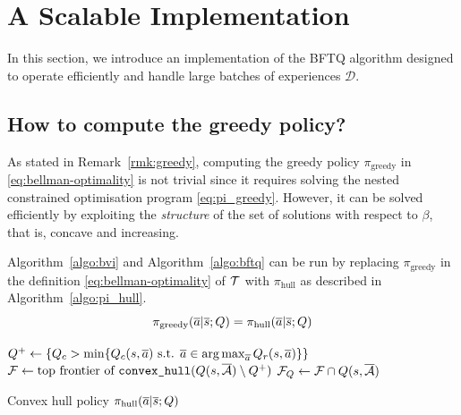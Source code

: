 \documentclass{article}
\begin{document}
\section{A Scalable Implementation}

\label{sec:scalable-bftq}
In this section, we introduce an implementation of the BFTQ algorithm designed to operate efficiently and handle large batches of experiences $\mathcal{D}$.

\subsection{How to compute the greedy policy?}

As stated in Remark~\ref{rmk:greedy}, computing the greedy policy $\pi_\text{greedy}$ in \eqref{eq:bellman-optimality} is not trivial since it requires solving the nested constrained optimisation program \eqref{eq:pi_greedy}.
However, it can be solved efficiently by exploiting the \emph{structure} of the set of solutions with respect to $\beta$, that is, concave and increasing. 

\begin{proposition}
\label{prop:bftq_pi_hull}
Algorithm~\ref{algo:bvi} and Algorithm~\ref{algo:bftq} can be run by replacing $\pi_\text{greedy}$ in the definition \eqref{eq:bellman-optimality} of $\mathcal{T}$ with $\pi_\text{hull}$ as described in Algorithm~\ref{algo:pi_hull}.
\begin{equation*}
    \pi_\text{greedy}(\overline{a}|\overline{s}; Q) = \pi_\text{hull}(\overline{a}|\overline{s}; Q)
\end{equation*}
\end{proposition}

\begin{algorithm}
\DontPrintSemicolon
{}
$Q^+\leftarrow \{Q_c > \min \{Q_c(s,\overline{a}) \text{ s.t. }\overline{a}\in\operatorname*{arg\,max}_{\overline{a}} Q_r(s,\overline{a})\} \}$\;
$\mathcal{F} \leftarrow \text{top frontier of }\texttt{convex\_hull}(Q(s,\overline{\mathcal{A}}) \setminus Q^+)$\;
$\mathcal{F}_Q \leftarrow \mathcal{F}\cap Q(s,\overline{\mathcal{A}})$\;
\caption{Convex hull policy $\pi_\text{hull}(\overline{a}|\overline{s}; Q)$}
\label{algo:pi_hull}
\end{algorithm}
\end{document}
